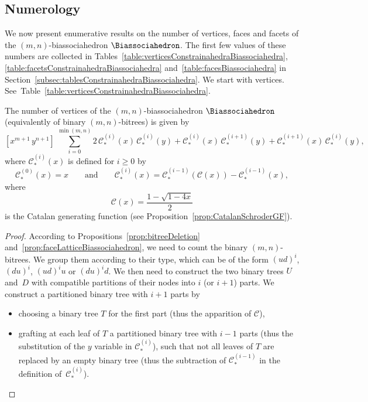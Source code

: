 \documentclass[AHL,Unicode,longabstracts,published]{cedram}
\newcommand{\CGF}{\mathcal{C}}
\newcommand{\tCGF}{\mathcal{C}_\ast}
\begin{document}
\subsection{Numerology}\label{subsec:numerologyBiassociahedra}

We now present enumerative results on the number of vertices, faces and facets of the $(m,n)$-biassociahedron $\Biassociahedron$. The first few values of these numbers are collected in Tables~\ref{table:verticesConstrainahedraBiassociahedra}, \ref{table:facetsConstrainahedraBiassociahedra} and~\ref{table:facesBiassociahedra} in Section~\ref{subsec:tablesConstrainahedraBiassociahedra}. We start with vertices. See~Table~\ref{table:verticesConstrainahedraBiassociahedra}.

\begin{prop}\label{prop:numberVerticesBiassociahedra}
The number of vertices of the $(m,n)$-biassociahedron \linebreak $\Biassociahedron$ (equivalently of binary $(m,n)$-bitrees) is given by
\[
\left[x^{m+1} \, y^{n+1}\right] \, \sum_{i = 0}^{\min(m,n)} 2 \, \tCGF^{(i)}(x) \, \tCGF^{(i)}(y) + \tCGF^{(i)}(x) \, \tCGF^{(i+1)}(y) + \tCGF^{(i+1)}(x) \, \tCGF^{(i)}(y),
\]
where $\tCGF^{(i)}(x)$ is defined for $i \ge 0$ by
\[
\tCGF^{(0)}(x) = x
\qquad\text{and}\qquad
\tCGF^{(i)}(x) = \tCGF^{(i-1)}(\CGF(x)) - \tCGF^{(i-1)}(x),
\]
where
\[
\CGF(x) = \frac{1-\sqrt{1-4x}}{2}
\]
is the Catalan generating function (see Proposition~\ref{prop:CatalanSchroderGF}).
\end{prop}

\begin{proof}
According to Propositions~\ref{prop:bitreeDeletion} and~\ref{prop:faceLatticeBiassociahedron}, we need to count the binary $(m,n)$-bitrees. We group them according to their type, which can be of the form $(ud)^i\!$, $(du)^i$, $(ud)^iu$ or $(du)^id$. We then need to construct the two binary trees $U$ and~$D$ with compatible partitions of their nodes into $i$ (or $i+1$) parts. We construct a partitioned binary tree with $i+1$ parts by
\begin{itemize}
\item choosing a binary tree $T$ for the first part (thus the apparition of $\CGF$),
\item grafting at each leaf of $T$ a partitioned binary tree with $i-1$ parts (thus the substitution of the $y$ variable in $\tCGF^{(i)}$), such that not all leaves of $T$ are replaced by an empty binary tree (thus the subtraction of $\tCGF^{(i-1)}$ in the definition of~$\tCGF^{(i)}$).
\qedhere
\end{itemize}
\end{proof}
\end{document}
